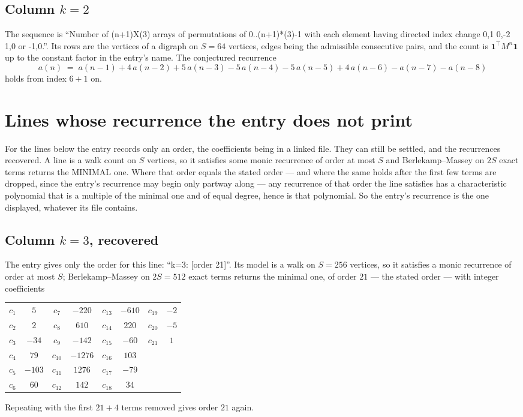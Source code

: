 \documentclass[11pt,a4paper]{article}
\theoremstyle{plain}
\theoremstyle{definition}
\begin{document}
\subsection*{Column $k$$=2$}
The sequence is ``Number of (n+1)X(3) arrays of permutations of 0..(n+1)*(3)-1 with each element having directed index change 0,1 0,-2 1,0 or -1,0.''. Its rows are the vertices of a digraph on
$S=64$ vertices, edges being the admissible consecutive pairs, and the count is
$\mathbf{1}^{\!\top}M^{n}\mathbf{1}$ up to the constant factor in the entry's name.
The conjectured recurrence
\[
a(n)\;=\;a(n-1) + 4\,a(n-2) + 5\,a(n-3) - 5\,a(n-4) - 5\,a(n-5) + 4\,a(n-6) - a(n-7) - a(n-8)
\]
holds from index $6+1$ on.


\section{Lines whose recurrence the entry does not print}

For the lines below the entry records only an order, the coefficients being in a linked file.
They can still be settled, and the recurrences recovered. A line is a walk count on $S$
vertices, so it satisfies some monic recurrence of order at most $S$ and Berlekamp--Massey on
$2S$ exact terms returns the MINIMAL one. Where that order equals the stated order --- and
where the same holds after the first few terms are dropped, since the entry's recurrence may
begin only partway along --- any recurrence of that order the line satisfies has a
characteristic polynomial that is a multiple of the minimal one and of equal degree, hence is
that polynomial. So the entry's recurrence is the one displayed, whatever its file contains.

\subsection*{Column $k=3$, recovered}
The entry gives only the order for this line: ``k=3: [order 21]''. Its model is a walk on
$S=256$ vertices, so it satisfies a monic recurrence of order at most $S$;
Berlekamp--Massey on $2S=512$ exact terms returns the minimal one, of order
$21$ --- the stated order --- with integer coefficients
\begin{center}\small\begin{tabular}{cccccccc}
$c_{1}$ & $5$ & $c_{7}$ & $-220$ & $c_{13}$ & $-610$ & $c_{19}$ & $-2$ \\
$c_{2}$ & $2$ & $c_{8}$ & $610$ & $c_{14}$ & $220$ & $c_{20}$ & $-5$ \\
$c_{3}$ & $-34$ & $c_{9}$ & $-142$ & $c_{15}$ & $-60$ & $c_{21}$ & $1$ \\
$c_{4}$ & $79$ & $c_{10}$ & $-1276$ & $c_{16}$ & $103$ &  &  \\
$c_{5}$ & $-103$ & $c_{11}$ & $1276$ & $c_{17}$ & $-79$ &  &  \\
$c_{6}$ & $60$ & $c_{12}$ & $142$ & $c_{18}$ & $34$ &  &  \\
\end{tabular}\end{center}
Repeating with the first $21+4$ terms removed gives order $21$ again.
\end{document}
